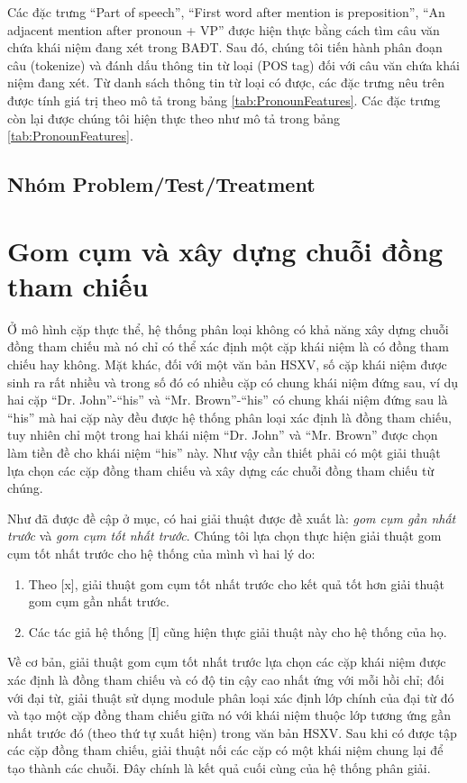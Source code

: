 Các đặc trưng ``Part of speech'', ``First word after mention is preposition'', ``An adjacent mention after pronoun + VP'' được hiện thực bằng cách tìm câu văn chứa khái niệm đang xét trong BAĐT. Sau đó, chúng tôi tiến hành phân đoạn câu (tokenize) và đánh dấu thông tin từ loại (POS tag)\cite{treebank} đối với câu văn chứa khái niệm đang xét. Từ danh sách thông tin từ loại có được, các đặc trưng nêu trên được tính giá trị theo mô tả trong bảng \ref{tab:PronounFeatures}. Các đặc trưng còn lại được chúng tôi hiện thực theo như mô tả trong bảng \ref{tab:PronounFeatures}.

\subsection*{Nhóm Problem/Test/Treatment}

\section{Gom cụm và xây dựng chuỗi đồng tham chiếu}
Ở mô hình cặp thực thể, hệ thống phân loại không có khả năng xây dựng chuỗi đồng tham chiếu mà nó chỉ có thể xác định một cặp khái niệm là có đồng tham chiếu hay không. Mặt khác, đối với một văn bản HSXV, số cặp khái niệm được sinh ra rất nhiều và trong số đó có nhiều cặp có chung khái niệm đứng sau, ví dụ hai cặp “Dr. John”-“his” và “Mr. Brown”-“his” có chung khái niệm đứng sau là “his” mà hai cặp này đều được hệ thống phân loại xác định là đồng tham chiếu, tuy nhiên chỉ một trong hai khái niệm “Dr. John” và “Mr. Brown” được chọn làm tiền đề cho khái niệm “his” này. Như vậy cần thiết phải có một giải thuật lựa chọn các cặp đồng tham chiếu và xây dựng các chuỗi đồng tham chiếu từ chúng.

Như đã được đề cập ở mục, có hai giải thuật được đề xuất là: \emph{gom cụm gần nhất trước} và \emph{gom cụm tốt nhất trước}. Chúng tôi lựa chọn thực hiện giải thuật gom cụm tốt nhất trước cho hệ thống của mình vì hai lý do:
\begin{enumerate}[leftmargin=\the\parindent]
\item Theo [x], giải thuật gom cụm tốt nhất trước cho kết quả tốt hơn giải thuật gom cụm gần nhất trước.
\item Các tác giả hệ thống [I] cũng hiện thực giải thuật này cho hệ thống của họ.
\end{enumerate}

Về cơ bản, giải thuật gom cụm tốt nhất trước lựa chọn các cặp khái niệm được xác định là đồng tham chiếu và có độ tin cậy cao nhất ứng với mỗi hồi chỉ; đối với đại từ, giải thuật sử dụng module phân loại xác định lớp chính của đại từ đó và tạo một cặp đồng tham chiếu giữa nó với khái niệm thuộc lớp tương ứng gần nhất trước đó (theo thứ tự xuất hiện) trong văn bản HSXV. Sau khi có được tập các cặp đồng tham chiếu, giải thuật nối các cặp có một khái niệm chung lại để tạo thành các chuỗi. Đây chính là kết quả cuối cùng của hệ thống phân giải.

